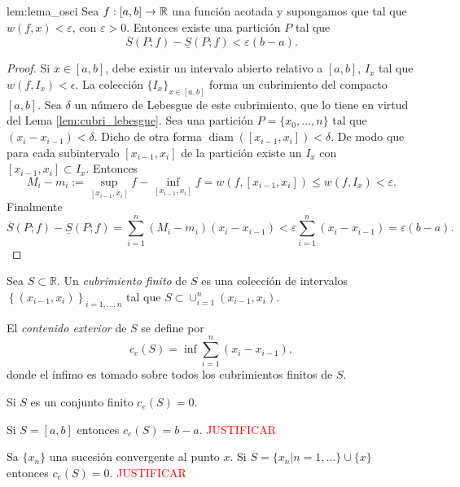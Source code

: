 \begin{lema}{lem:lema_osci} Sea $f:[a,b]\to\mathbb{R}$ una función acotada y supongamos que  tal que $w(f,x)<\varepsilon$, con $\varepsilon>0$. Entonces existe una partición $P$ tal que 
\begin{equation}\label{eq:lema_oscila}
 \overline{S}(P;f)-\underline{S}(P;f)<\varepsilon(b-a).
\end{equation}
 
\end{lema}
\begin{proof} Si $x\in [a,b]$, debe existir un intervalo abierto relativo a $[a,b]$,  $I_x$ tal que $w(f,I_x)<\epsilon$. La colección $\{I_x\}_{x\in [a,b]}$ forma un cubrimiento del compacto $[a,b]$. Sea $\delta$ un número de Lebesgue de este cubrimiento, que lo tiene en virtud del Lema \ref{lem:cubri_lebesgue}. Sea una partición $P=\{x_0,\ldots,n\}$ tal que $(x_i-x_{i-1})<\delta$. Dicho de otra forma $\operatorname{diam}( [x_{i-1},x_i])<\delta$. De modo que para cada subintervalo $[x_{i-1},x_i]$ de la partición existe un $I_x$ con $[x_{i-1},x_i]\subset I_x$. Entonces 
\[
 M_i-m_i:=\sup\limits_{[x_{i-1},x_i]} f-\inf\limits_{[x_{i-1},x_i]} f=w(f,[x_{i-1},x_i])\leq w(f,I_x)<\varepsilon.
\]
Finalmente
\[
 \overline{S}(P;f)-\underline{S}(P;f)=\sum_{i=1}^n( M_i-m_i)(x_i-x_{i-1})<\varepsilon\sum_{i=1}^n(x_i-x_{i-1})=\varepsilon(b-a).
\]


 
\end{proof}





 \begin{definicion}{} Sea $S\subset\mathbb{R}$. Un \emph{cubrimiento finito} de $S$ es una colección de intervalos $\left\{ (x_{i-1},x_i)\right\}_{i=1,\ldots,n}$ tal que $S\subset \cup_{i=1}^n(x_{i-1},x_i)$.
 
 El \emph{contenido exterior} de $S$ se define por 
 \[
  c_e(S)=\inf \sum_{i=1}^n (x_i-x_{i-1}),
 \]
donde el ínfimo es tomado sobre todos los cubrimientos finitos de $S$.
  
 \end{definicion}
 
 \begin{ejemplo}{} Si $S$ es un conjunto finito $c_e(S)=0$.
  
 \end{ejemplo}

 \begin{ejemplo}{} Si $S=[a,b]$ entonces  $c_e(S)=b-a$. \textcolor{red}{JUSTIFICAR}
    
 \end{ejemplo}
 \begin{ejemplo}{} Sa $\{x_n\}$ una sucesión convergente al punto $x$. Si $S=\{x_n| n=1,\dots\}\cup\{x\}$ entonces  $c_e(S)=0$. \textcolor{red}{JUSTIFICAR}
    
 \end{ejemplo}
 
